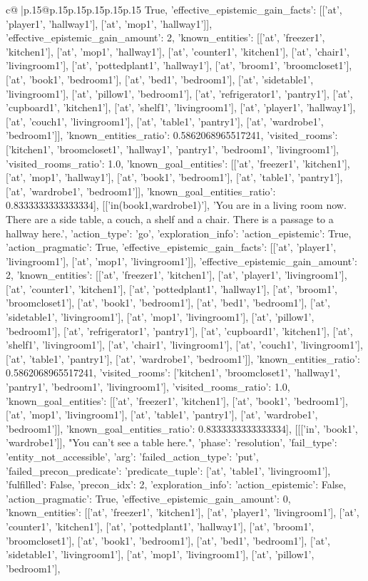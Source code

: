 \documentclass{article}
\begin{document}
{\begin{supertabular}{c@{$\;$}|p{.15\linewidth}@{}p{.15\linewidth}p{.15\linewidth}p{.15\linewidth}p{.15\linewidth}p{.15\linewidth}}
{{{True, 'effective_epistemic_gain_facts': [['at', 'player1', 'hallway1'], ['at', 'mop1', 'hallway1']], 'effective_epistemic_gain_amount': 2, 'known_entities': [['at', 'freezer1', 'kitchen1'], ['at', 'mop1', 'hallway1'], ['at', 'counter1', 'kitchen1'], ['at', 'chair1', 'livingroom1'], ['at', 'pottedplant1', 'hallway1'], ['at', 'broom1', 'broomcloset1'], ['at', 'book1', 'bedroom1'], ['at', 'bed1', 'bedroom1'], ['at', 'sidetable1', 'livingroom1'], ['at', 'pillow1', 'bedroom1'], ['at', 'refrigerator1', 'pantry1'], ['at', 'cupboard1', 'kitchen1'], ['at', 'shelf1', 'livingroom1'], ['at', 'player1', 'hallway1'], ['at', 'couch1', 'livingroom1'], ['at', 'table1', 'pantry1'], ['at', 'wardrobe1', 'bedroom1']], 'known_entities_ratio': 0.5862068965517241, 'visited_rooms': ['kitchen1', 'broomcloset1', 'hallway1', 'pantry1', 'bedroom1', 'livingroom1'], 'visited_rooms_ratio': 1.0, 'known_goal_entities': [['at', 'freezer1', 'kitchen1'], ['at', 'mop1', 'hallway1'], ['at', 'book1', 'bedroom1'], ['at', 'table1', 'pantry1'], ['at', 'wardrobe1', 'bedroom1']], 'known_goal_entities_ratio': 0.8333333333333334}}], [['in(book1,wardrobe1)'], 'You are in a living room now. There are a side table, a couch, a shelf and a chair. There is a passage to a hallway here.', {'action_type': 'go', 'exploration_info': {'action_epistemic': True, 'action_pragmatic': True, 'effective_epistemic_gain_facts': [['at', 'player1', 'livingroom1'], ['at', 'mop1', 'livingroom1']], 'effective_epistemic_gain_amount': 2, 'known_entities': [['at', 'freezer1', 'kitchen1'], ['at', 'player1', 'livingroom1'], ['at', 'counter1', 'kitchen1'], ['at', 'pottedplant1', 'hallway1'], ['at', 'broom1', 'broomcloset1'], ['at', 'book1', 'bedroom1'], ['at', 'bed1', 'bedroom1'], ['at', 'sidetable1', 'livingroom1'], ['at', 'mop1', 'livingroom1'], ['at', 'pillow1', 'bedroom1'], ['at', 'refrigerator1', 'pantry1'], ['at', 'cupboard1', 'kitchen1'], ['at', 'shelf1', 'livingroom1'], ['at', 'chair1', 'livingroom1'], ['at', 'couch1', 'livingroom1'], ['at', 'table1', 'pantry1'], ['at', 'wardrobe1', 'bedroom1']], 'known_entities_ratio': 0.5862068965517241, 'visited_rooms': ['kitchen1', 'broomcloset1', 'hallway1', 'pantry1', 'bedroom1', 'livingroom1'], 'visited_rooms_ratio': 1.0, 'known_goal_entities': [['at', 'freezer1', 'kitchen1'], ['at', 'book1', 'bedroom1'], ['at', 'mop1', 'livingroom1'], ['at', 'table1', 'pantry1'], ['at', 'wardrobe1', 'bedroom1']], 'known_goal_entities_ratio': 0.8333333333333334}}], [[['in', 'book1', 'wardrobe1']], "You can't see a table here.", {'phase': 'resolution', 'fail_type': 'entity_not_accessible', 'arg': {'failed_action_type': 'put', 'failed_precon_predicate': {'predicate_tuple': ['at', 'table1', 'livingroom1'], 'fulfilled': False, 'precon_idx': 2}}, 'exploration_info': {'action_epistemic': False, 'action_pragmatic': True, 'effective_epistemic_gain_amount': 0, 'known_entities': [['at', 'freezer1', 'kitchen1'], ['at', 'player1', 'livingroom1'], ['at', 'counter1', 'kitchen1'], ['at', 'pottedplant1', 'hallway1'], ['at', 'broom1', 'broomcloset1'], ['at', 'book1', 'bedroom1'], ['at', 'bed1', 'bedroom1'], ['at', 'sidetable1', 'livingroom1'], ['at', 'mop1', 'livingroom1'], ['at', 'pillow1', 'bedroom1'], }}}
\end{supertabular}}
\end{document}
